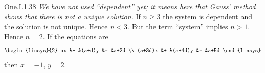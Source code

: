 \begin{ans}{One.I.1.38}
       \answerasgiven
       \textit{We have not used ``dependent'' yet;
       it means here that Gauss'
       method shows that there is not a unique solution.}
       If \( n\geq 3 \) the system is dependent and the solution is not
       unique.
       Hence \( n<3 \).
       But the term ``system'' implies \( n>1 \).
       Hence \( n=2 \).
       If the equations are
       \begin{equation*}
         \begin{linsys}{2}
              ax  &+ &(a+d)y  &=  &a+2d  \\
         (a+3d)x  &+ &(a+4d)y &=  &a+5d
         \end{linsys}
       \end{equation*}
       then \( x=-1 \), \( y=2 \).
    
\end{ans}
